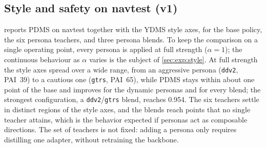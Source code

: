 \subsection{Style and safety on navtest (v1)}
\label{sec:exp:v1}
 reports PDMS on navtest together with the YDMS style axes, for the base
policy, the six persona teachers, and three persona blends. To keep the comparison on
a single operating point, every persona is applied at full strength ($\alpha{=}1$);
the continuous behaviour as $\alpha$ varies is the subject of \cref{sec:exp:style}. At
full strength the style axes spread over a wide range, from an aggressive persona
(\texttt{ddv2}, PAI~39) to a cautious one (\texttt{gtrs}, PAI~65), while PDMS stays
within about one point of the base and improves for the dynamic personas and for every
blend; the strongest configuration, a \texttt{ddv2}/\texttt{gtrs} blend, reaches
0.954. The six teachers settle in distinct regions of the style axes, and the blends
reach points that no single teacher attains, which is the behavior expected if
personas act as composable directions. The set of teachers is not fixed: adding a
persona only requires distilling one adapter, without retraining the backbone.

